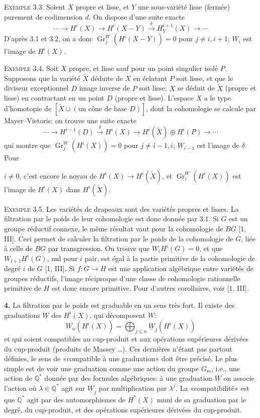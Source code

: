 \documentclass[8pt]{extarticle}
\newcommand{\DSourceFolio}{--}
\newcommand{\DAuthorityPage}{--}
\newcommand{\SourcePage}[2]{%
  \renewcommand{\DSourceFolio}{#1}%
  \renewcommand{\DAuthorityPage}{#2}%
  \thispagestyle{dpage}%
}
\newcommand{\EndSourcePage}{\clearpage}
\newcommand{\ReaderFont}{\fontsize{7.35}{8.15}\selectfont}
\newcommand{\NumPara}[1]{\par\noindent\textbf{#1}\enspace}
\newcommand{\NamedPara}[1]{\par\noindent\textsc{#1}\enspace}
\newcommand{\Q}{\mathbb{Q}}
\newcommand{\Gr}{\operatorname{Gr}}
\newcommand{\Wg}{\underline{W}}
\begin{document}
\NamedPara{Exemple 3.3.} Soient \(X\) propre et lisse, et \(Y\) une sous-variété lisse (fermée) purement de codimension \(d\). On dispose d'une suite exacte
\[
\cdots\to H^i(X)\to H^i(X-Y)\xrightarrow{\delta}H_Y^{i+1}(X)\to\cdots
\]
D'après 3.1 et 3.2, on a donc \(\Gr_j^W(H^i(X-Y))=0\) pour \(j\ne i,i+1\); \(W_i\) est l'image de \(H^i(X)\).

\NamedPara{Exemple 3.4.} Soit \(X\) propre, et lisse sauf pour un point singulier isolé \(P\). Supposons que la variété \(\widetilde X\) déduite de \(X\) en éclatant \(P\) soit lisse, et que le diviseur exceptionnel \(D\) image inverse de \(P\) soit lisse: \(X\) se déduit de \(\widetilde X\) (propre et lisse) en contractant en un point \(D\) (propre et lisse). L'espace \(X\) a le type d'homotopie de \([\widetilde X\cup(\text{un cône de base }D)]\), dont la cohomologie se calcule par Mayer--Vietoris; on trouve une suite exacte
\[
\cdots\to H^{i-1}(D)\xrightarrow{\delta}H^i(X)\to H^i(\widetilde X)\oplus H^i(P)\to\cdots
\]
qui montre que \(\Gr_j^W(H^i(X))=0\) pour \(j\ne i-1,i\); \(W_{i-1}\) est l'image de \(\delta\). Pour
\EndSourcePage

\SourcePage{81}{3}
\ReaderFont
\(i\ne0\), c'est encore le noyau de \(H^i(X)\to H^i(\widetilde X)\), et \(\Gr_i^W(H^i(X))\) est l'image de \(H^i(X)\) dans \(H^i(\widetilde X)\).

\NamedPara{Exemple 3.5.} Les variétés de drapeaux sont des variétés propres et lisses. La filtration par le poids de leur cohomologie est donc donnée par 3.1. Si \(G\) est un groupe réductif connexe, le même résultat vaut pour la cohomologie de \(BG\) [1, III]. Ceci permet de calculer la filtration par le poids de la cohomologie de \(G\), liée à celle de \(BG\) par transgression. On trouve que \(W_iH^i(G)=0\), et que \(W_{i+1}H^i(G)\), nul pour \(i\) pair, est égal à la partie primitive de la cohomologie de degré \(i\) de \(G\) [1, III]. Si \(f:G\to H\) est une application algébrique entre variétés de groupes réductifs, l'image réciproque d'une classe de cohomologie rationnelle primitive de \(H\) est donc encore primitive. Pour d'autres corollaires, voir [1, III].

\NumPara{4.} La filtration par le poids est graduable en un sens très fort. Il existe des graduations \(\Wg\) des \(H^i(X)\), qui décomposent \(W\):
\begin{equation}\tag{4.1}
W_n(H^i(X))=\bigoplus_{j\le n}\Wg_j(H^i(X))
\end{equation}
et qui soient compatibles au cup-produit et aux opérations supérieures dérivées du cup-produit (produits de Massey \ldots). Ces dernières n'étant pas partout définies, le sens de «compatible à une graduation» doit être précisé. Le plus simple est de voir une graduation comme une action du groupe \(G_m\), i.e., une action de \(\Q^*\) donnée par des formules algébriques: à une graduation \(\Wg\) on associe l'action où \(\lambda\in\Q^*\) agit sur \(\Wg_j\) par multiplication par \(\lambda^j\). La «compatibilité» est que \(\Q^*\) agit par des automorphismes de \(H^*(X)\) muni de sa graduation par le degré, du cup-produit, et des opérations supérieures dérivées du cup-produit.
\end{document}
